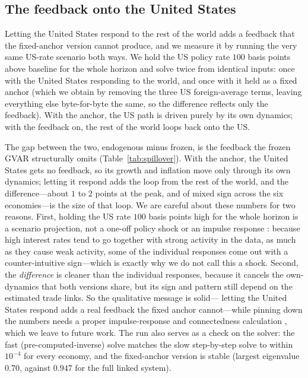 \documentclass[11pt]{article}
\begin{document}
\subsection{The feedback onto the United States}
\label{sub:scenario-endous}

Letting the United States respond to the rest of the world adds a feedback that the fixed-anchor version
cannot produce, and we measure it by running the very same US-rate scenario both ways. We hold the US
policy rate $100$ basis points above baseline for the whole horizon and solve twice from identical inputs:
once with the United States responding to the world, and once with it held as a fixed anchor (which we
obtain by removing the three US foreign-average terms, leaving everything else byte-for-byte the same, so
the difference reflects only the feedback). With the anchor, the US path is driven purely by its own
dynamics; with the feedback on, the rest of the world loops back onto the US.

The gap between the two, endogenous minus frozen, is the feedback the frozen GVAR structurally omits
(Table~\ref{tab:spillover}). With the anchor, the United States gets no feedback, so its growth and
inflation move only through its own dynamics; letting it respond adds the loop from the rest of the world,
and the difference---about $1$ to $2$ points at the peak, and of mixed sign across the six economies---is
the size of that loop. We are careful about these numbers for two reasons. First, holding the US rate
$100$ basis points high for the whole horizon is a scenario projection, not a one-off policy shock or an
impulse response \citep{PesaranShin1998}: because high interest rates tend to go together with strong
activity in the data, as much as they cause weak activity, some of the individual responses come out with
a counter-intuitive sign---which is exactly why we do not call this a shock. Second, the \emph{difference}
is cleaner than the individual responses, because it cancels the own-dynamics that both versions share, but
its sign and pattern still depend on the estimated trade links. So the qualitative message is solid---
letting the United States respond adds a real feedback the fixed anchor cannot---while pinning down the
numbers needs a proper impulse-response and connectedness calculation \citep{DieboldYilmaz2012}, which we
leave to future work. The run also serves as a check on the solver: the fast (pre-computed-inverse) solve
matches the slow step-by-step solve to within $10^{-4}$ for every economy, and the fixed-anchor version is
stable (largest eigenvalue $0.70$, against $0.947$ for the full linked system).
\end{document}
